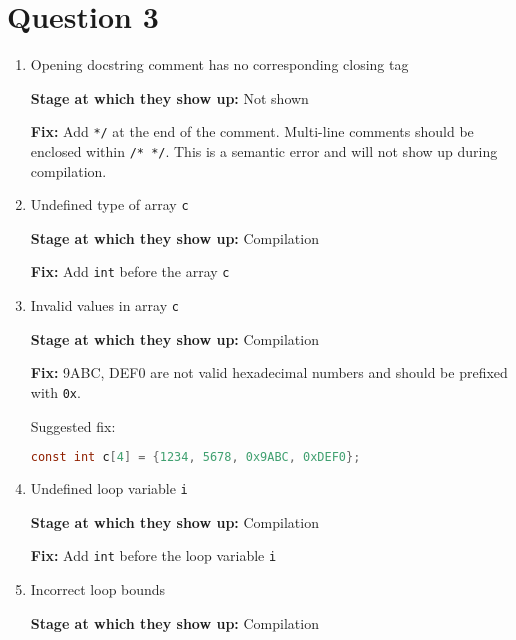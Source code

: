 \section*{Question 3}



\begin{enumerate}

      \item Opening docstring comment has no corresponding closing tag

            \textbf{Stage at which they show up:}
            Not shown

            \textbf{Fix:}
            Add \texttt{*/} at the end of the comment.
            Multi-line comments should be enclosed within \texttt{/* */}.
            This is a semantic error and will not show up during compilation.

      \item Undefined type of array \texttt{c}

            \textbf{Stage at which they show up:}
            Compilation

            \textbf{Fix:}
            Add \texttt{int} before the array \texttt{c}

      \item Invalid values in array \texttt{c}

            \textbf{Stage at which they show up:}
            Compilation

            \textbf{Fix:}
            9ABC, DEF0 are not valid hexadecimal numbers and should be prefixed with \texttt{0x}.

            Suggested fix:
            \begin{lstlisting}[language=C, frame=single]
const int c[4] = {1234, 5678, 0x9ABC, 0xDEF0};
            \end{lstlisting}

      \item Undefined loop variable \texttt{i}

            \textbf{Stage at which they show up:}
            Compilation

            \textbf{Fix:}
            Add \texttt{int} before the loop variable \texttt{i}

      \item Incorrect loop bounds

            \textbf{Stage at which they show up:}
            Compilation


\end{enumerate}
